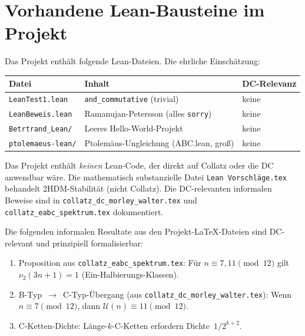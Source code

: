 \documentclass[12pt,a4paper]{article}
\newcommand{\vii}{\nu_2}
\newcommand{\U}{\mathcal{U}}
\begin{document}
\section{Vorhandene Lean-Bausteine im Projekt}
\label{sec:projekt}

Das Projekt enthält folgende Lean-Dateien. Die ehrliche Einschätzung:

\begin{center}
\begin{tabular}{lll}
\toprule
Datei & Inhalt & DC-Relevanz \\
\midrule
\texttt{LeanTest1.lean} & \lstinline|and_commutative| (trivial) & keine \\
\texttt{LeanBeweis.lean} & Ramanujan-Petersson (alles \texttt{sorry}) & keine \\
\texttt{Betrtrand\_Lean/} & Leeres Hello-World-Projekt & keine \\
\texttt{ptolemaeus-lean/} & Ptolemäus-Ungleichung (ABC.lean, groß) & keine \\
\bottomrule
\end{tabular}
\end{center}

\begin{tcolorbox}[warnung]
Das Projekt enthält \emph{keinen} Lean-Code, der direkt auf Collatz
oder die DC anwendbar wäre.
Die mathematisch substanzielle Datei \texttt{Lean Vorschläge.tex}
behandelt 2HDM-Stabilität (nicht Collatz).
Die DC-relevanten informalen Beweise sind in
\texttt{collatz\_dc\_morley\_walter.tex} und
\texttt{collatz\_eabc\_spektrum.tex} dokumentiert.
\end{tcolorbox}

Die folgenden informalen Resultate aus den Projekt-LaTeX-Dateien
sind DC-relevant und prinzipiell formalisierbar:

\begin{enumerate}[label=(\alph*)]
  \item Proposition aus \texttt{collatz\_eabc\_spektrum.tex}:
    Für $n \equiv 7, 11 \pmod{12}$ gilt $\vii(3n+1) = 1$ (Ein-Halbierungs-Klassen).
  \item B-Typ~$\to$~C-Typ-Übergang (aus \texttt{collatz\_dc\_morley\_walter.tex}):
    Wenn $n \equiv 7 \pmod{12}$, dann $\U(n) \equiv 11 \pmod{12}$.
  \item C-Ketten-Dichte: Länge-$k$-C-Ketten erfordern Dichte~$1/2^{k+2}$.
\end{enumerate}
\end{document}
